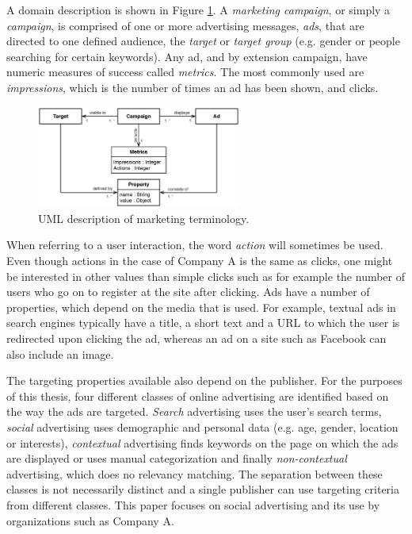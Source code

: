 \documentclass{sig-alternate}
\begin{document}
A domain description is shown in Figure \ref{fig:MarketingTerminology}. A \emph{marketing campaign}, or simply a \emph{campaign}, is comprised of one or more advertising messages, \emph{ads}, that are directed to one defined audience, the \emph{target} or \emph{target group} (e.g. gender or people searching for certain keywords). Any ad, and by extension campaign, have numeric measures of success called \emph{metrics}. The most commonly used are \emph{impressions}, which is the number of times an ad has been shown, and clicks.

\begin{figure}[htb] \centering \includegraphics[width=0.6\textwidth]{marketing-uml.eps}
	\caption{UML description of marketing terminology.}
	\label{fig:MarketingTerminology}
\end{figure}

When referring to a user interaction, the word \emph{action} will sometimes be used. Even though actions in the case of Company A is the same as clicks, one might be interested in other values than simple clicks such as for example the number of users who go on to register at the site after clicking. Ads have a number of properties, which depend on the media that is used. For example, textual ads in search engines typically have a title, a short text and a URL to which the user is redirected upon clicking the ad, whereas an ad on a site such as Facebook can also include an image.

The targeting properties available also depend on the publisher. For the purposes of this thesis, four different classes of online advertising are identified based on the way the ads are targeted. \emph{Search} advertising uses the user's search terms, \emph{social} advertising uses demographic and personal data (e.g. age, gender, location or interests), \emph{contextual} advertising finds keywords on the page on which the ads are displayed or uses manual categorization and finally \emph{non-contextual} advertising, which does no relevancy matching. The separation between these classes is not necessarily distinct and a single publisher can use targeting criteria from different classes. This paper focuses on social advertising and its use by organizations such as Company A.
\end{document}
